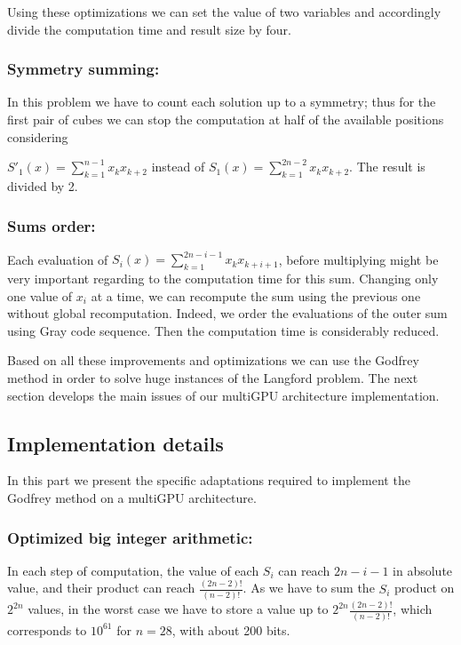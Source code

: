Using these optimizations we can set the value of two variables and accordingly divide the computation time and result size by four.

\subsubsection{Symmetry summing: }
In this problem we have to count each solution up to a symmetry; thus for the first pair of cubes we can stop the computation at half of the available positions considering 

\noindent $S'_1(x) = \sum_{k=1}^{n-1}x_kx_{k+2}$ instead of $S_1(x) = \sum_{k=1}^{2n-2} x_kx_{k+2}$.
The result is divided by 2. 

\subsubsection{Sums order: }
Each evaluation of $ S_i(x) = \sum_{k=1}^{2n-i-1} x_kx_{k+i+1} $, before multiplying might be very important regarding to the computation time for this sum. 
Changing only one value of $ x_i $ at a time, we can recompute the sum using the previous one without global recomputation. 
Indeed, we order the evaluations of the outer sum using Gray code sequence. 
Then the computation time is considerably reduced.  

Based on all these improvements and optimizations we can use the Godfrey method in order to solve huge instances of the Langford problem. 
The next section develops the main issues of our multiGPU architecture implementation. 

\subsection{Implementation details}
In this part we present the specific adaptations required to implement the Godfrey method on a multiGPU architecture.

\subsubsection{Optimized big integer arithmetic: }

In each step of computation, the value of each $S_i$ can reach $2n-i-1$ in absolute value, and their product can reach $\frac{(2n-2)!}{(n-2)!}$. 
As we have to sum the $S_i$ product on $2^{2n}$ values, in the worst case we have to store a value up to $2^{2n}\frac{(2n-2)!}{(n-2)!}$, which corresponds to $10^{61}$ for $n=28$, with about 200 bits.

